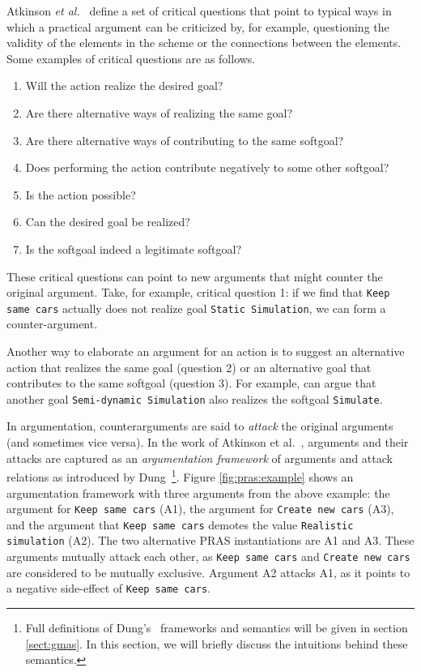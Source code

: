 Atkinson \emph{et al.}~\cite{atkinson2007} define a set of critical questions that point to typical ways in which a practical argument can be criticized by, for example, questioning the validity of the elements in the scheme or the connections between the elements. Some examples of critical questions are as follows.

\begin{enumerate}
\item Will the action realize the desired goal?
\item Are there alternative ways of realizing the same goal?
\item Are there alternative ways of contributing to the same softgoal?
\item Does performing the action contribute negatively to some other softgoal?
\item Is the action possible?
\item Can the desired goal be realized?
\item Is the softgoal indeed a legitimate softgoal?
\end{enumerate}

These critical questions can point to new arguments that might counter the original argument. Take, for example, critical question 1: if we find that  \texttt{Keep same cars} actually does not realize goal \texttt{Static Simulation}, we can form a counter-argument.

Another way to elaborate an argument for an action is to suggest an alternative action that realizes the same goal (question 2) or an alternative goal that contributes to the same softgoal (question 3). For example,  can argue that another goal \texttt{Semi-dynamic Simulation} also realizes the softgoal \texttt{Simulate}. 

In argumentation, counterarguments are said to \emph{attack} the original arguments (and sometimes vice versa). In the work of Atkinson et al.~\cite{atkinson2007}, arguments and their attacks are captured as an \emph{argumentation framework} of arguments and attack relations as introduced by Dung~\cite{Dung1995}\footnote{Full definitions of Dung's~\cite{Dung1995} frameworks and semantics will be given in section \ref{sect:gmas}. In this section, we will briefly discuss the intuitions behind these semantics.}. Figure \ref{fig:pras:example} shows an argumentation framework with three arguments from the above example: the argument for  \texttt{Keep same cars} (A1), the argument for \texttt{Create new cars} (A3), and the argument that \texttt{Keep same cars} demotes the value  \texttt{Realistic simulation} (A2). The two alternative PRAS instantiations are A1 and A3. These arguments mutually attack each other, as \texttt{Keep same cars}  and \texttt{Create new cars} are considered to be mutually exclusive. Argument A2 attacks A1, as it points to a negative side-effect of \texttt{Keep same cars}. %

